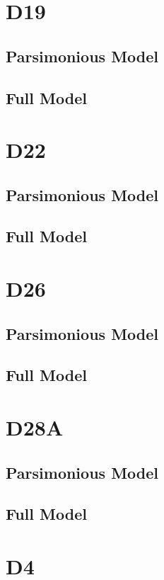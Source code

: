 \documentclass[12pt]{amsart}
\begin{document}
\section{D19}
\subsection{Parsimonious Model}

\subsection{Full Model}

\section{D22}
\subsection{Parsimonious Model}

\subsection{Full Model}

\section{D26}
\subsection{Parsimonious Model}

\subsection{Full Model}

\section{D28A}
\subsection{Parsimonious Model}

\subsection{Full Model}

\section{D4}
\end{document}
